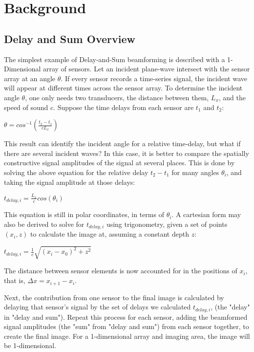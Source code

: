 \chapter{Background}
\label{chapter2:background}
\graphicspath{{Chapter-2/graphics/}}

\section{Delay and Sum Overview}
\label{chapter2:das_Overview}
The simplest example of Delay-and-Sum beamforming is described with a 1-Dimensional array of sensors. Let an incident plane-wave intersect with the sensor array at an angle $\theta$. If every sensor records a time-series signal, the incident wave will appear at different times across the sensor array. To determine the incident angle $\theta$, one only needs two transducers, the distance between them, $L_x$, and the speed of sound $c$. Suppose the time delays from each sensor are $t_1$ and $t_2$:

\begin{center} $\theta = cos^{-1}(\frac{t_2 - t_1}{c L_x})$ \end{center}

This result can identify the incident angle for a relative time-delay, but what if there are several incident waves? In this case, it is better to compare the spatially constructive signal amplitudes of the signal at several places. This is done by solving the above equation for the relative delay $t_2 - t_1$ for many angles $\theta_i$, and taking the signal amplitude at those delays:

\begin{center} $t_{delay,i} = \frac{L_x}{c} cos(\theta_i)$ \end{center}

This equation is still in polar coordinates, in terms of $\theta_i$. A cartesian form may also be derived to solve for $t_{delay,i}$ using trigonometry, given a set of points $(x_i,z)$ to calculate the image at, assuming a constant depth $z$:
 
\begin{center} $t_{delay,i} = \frac{1}{c} \sqrt{(x_i - x_0)^2 + z^2}$ \end{center}

The distance between sensor elements is now accounted for in the positions of $x_i$, that is, $\Delta{x} = x_{i+1} - x_i$.

Next, the contribution from one sensor to the final image is calculated by delaying that sensor's signal by the set of delays we calculated $t_{delay,i}$, (the "delay" in "delay and sum"). Repeat this process for each sensor, adding the beamformed signal amplitudes (the "sum" from "delay and sum") from each sensor together, to create the final image. For a 1-dimensional array and imaging area, the image will be 1-dimensional.

